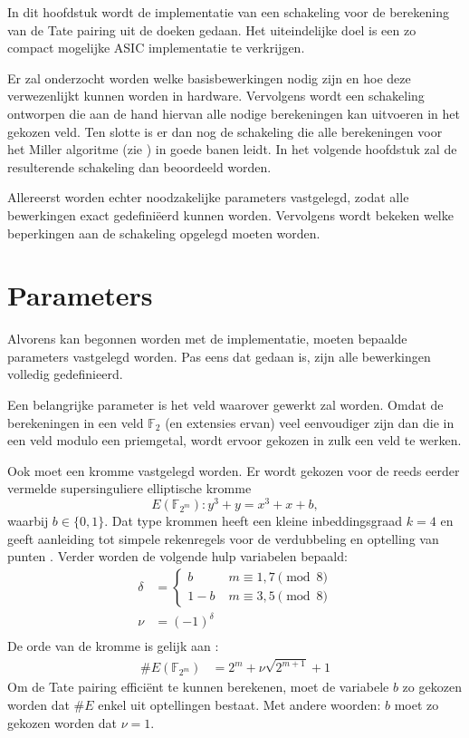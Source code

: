 
In dit hoofdstuk wordt de implementatie van een schakeling voor de berekening van de Tate pairing uit de doeken gedaan. Het uiteindelijke doel is een zo compact mogelijke  ASIC implementatie te verkrijgen.

Er zal onderzocht worden welke basisbewerkingen nodig zijn en hoe deze verwezenlijkt kunnen worden in hardware. Vervolgens wordt een schakeling ontworpen die aan de hand hiervan alle nodige berekeningen kan uitvoeren in het gekozen veld. Ten slotte is er dan nog de schakeling die alle berekeningen voor het Miller algoritme (zie ) in goede banen leidt. In het volgende hoofdstuk zal de resulterende schakeling dan beoordeeld worden.

Allereerst worden echter noodzakelijke parameters vastgelegd, zodat alle bewerkingen exact gedefini\"eerd kunnen worden. Vervolgens wordt bekeken welke beperkingen aan de schakeling opgelegd moeten worden.

\section{Parameters\label{sectie-implementatie-parameters}}

Alvorens kan begonnen worden met de implementatie, moeten bepaalde parameters vastgelegd worden. Pas eens dat gedaan is, zijn alle bewerkingen volledig gedefinieerd.

Een belangrijke parameter is het veld waarover gewerkt zal worden. Omdat de berekeningen in een veld $\mathbb{F}_2$ (en extensies ervan) veel eenvoudiger zijn dan die in een veld modulo een priemgetal, wordt ervoor gekozen in zulk een veld te werken.

Ook moet een kromme vastgelegd worden. Er wordt gekozen voor de reeds eerder vermelde supersinguliere elliptische kromme
\[E(\mathbb{F}_{2^m}): y^3 + y = x^3 + x + b,\]
waarbij $b \in \{0, 1\}$.  Dat type krommen heeft een kleine inbeddingsgraad $k = 4$ en geeft aanleiding tot simpele rekenregels voor de verdubbeling en optelling van punten \cite{barreto-efficient, hankerson-book}. Verder worden de volgende hulp variabelen bepaald:
\[\begin{aligned}
\delta	&= \begin{cases}
				b		\qquad &m \equiv 1, 7 \pmod 8\\
				1 - b			&m \equiv 3, 5	\pmod 8
				\end{cases}\\
\nu		&= (-1)^{\delta}\\
\end{aligned}\]
De orde van de kromme is gelijk aan \cite{barreto-efficient}:
\[\begin{aligned}
\#E(\mathbb{F}_{2^m})	&= 2^m + \nu \sqrt{2^{m + 1}} + 1
\end{aligned}\]
Om de Tate pairing effici\"ent te kunnen berekenen, moet de variabele $b$ zo gekozen worden dat $\#E$ enkel uit optellingen bestaat. Met andere woorden: $b$ moet zo gekozen worden dat $\nu = 1$.

